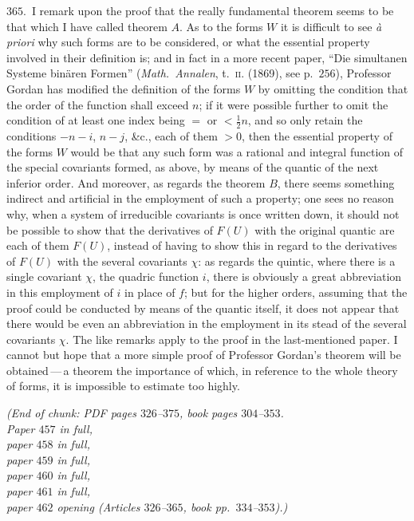 \documentclass[11pt,a4paper]{article}
\begin{document}
\noindent$365$.\ I remark upon the proof that the really fundamental
theorem seems to be that which I have called theorem $A$. As to the forms
$W$ it is difficult to see \textit{\`a priori} why such forms are to be
considered, or what the essential property involved in their definition
is; and in fact in a more recent paper, ``Die simultanen Systeme bin\"aren
Formen'' (\textit{Math.\ Annalen}, t.~\textsc{ii.} (1869), see p.~$256$),
Professor Gordan has modified the definition of the forms $W$ by omitting
the condition that the order of the function shall exceed $n$; if it were
possible further to omit the condition of at least one index being $=$ or
$<\tfrac{1}{2}n$, and so only retain the conditions $-n - i$, $n - j$,
\&c., each of them $> 0$, then the essential property of the forms $W$
would be that any such form was a rational and integral function of the
special covariants formed, as above, by means of the quantic of the next
inferior order. And moreover, as regards the theorem $B$, there seems
something indirect and artificial in the employment of such a property;
one sees no reason why, when a system of irreducible covariants is once
written down, it should not be possible to show that the derivatives of
$F(U)$ with the original quantic are each of them $F(U)$, instead of
having to show this in regard to the derivatives of $F(U)$ with the
several covariants $\chi$: as regards the quintic, where there is a single
covariant $\chi$, the quadric function $i$, there is obviously a great
abbreviation in this employment of $i$ in place of $f$; but for the
higher orders, assuming that the proof could be conducted by means of the
quantic itself, it does not appear that there would be even an
abbreviation in the employment in its stead of the several covariants
$\chi$. The like remarks apply to the proof in the last-mentioned paper.
I cannot but hope that a more simple proof of Professor Gordan's theorem
will be obtained\,---\,a theorem the importance of which, in reference to
the whole theory of forms, it is impossible to estimate too highly.

\medskip

\noindent\textit{(End of chunk: PDF pages $326$--$375$, book pages
$304$--$353$.\\
Paper $457$ in full,\\
paper $458$ in full,\\
paper $459$ in full,\\
paper $460$ in full,\\
paper $461$ in full,\\
paper $462$ opening (Articles $326$--$365$, book pp.\ $334$--$353$).)}
\end{document}
